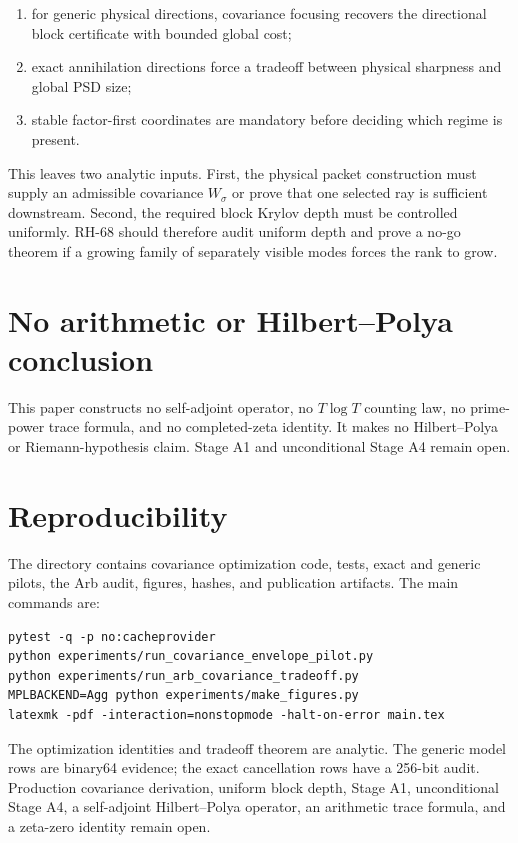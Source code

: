 \documentclass[11pt]{article}
\begin{document}
\begin{enumerate}[leftmargin=2.2em]
 \item for generic physical directions, covariance focusing recovers the
       directional block certificate with bounded global cost;
 \item exact annihilation directions force a tradeoff between physical
       sharpness and global PSD size;
 \item stable factor-first coordinates are mandatory before deciding which
       regime is present.
\end{enumerate}

This leaves two analytic inputs.  First, the physical packet construction
must supply an admissible covariance $W_\sigma$ or prove that one selected ray
is sufficient downstream.  Second, the required block Krylov depth must be
controlled uniformly.  RH-68 should therefore audit uniform depth and prove
a no-go theorem if a growing family of separately visible modes forces the
rank to grow.

\section{No arithmetic or Hilbert--Polya conclusion}

This paper constructs no self-adjoint operator, no $T\log T$ counting law,
no prime-power trace formula, and no completed-zeta identity.  It makes no
Hilbert--Polya or Riemann-hypothesis claim.  Stage A1 and unconditional Stage
A4 remain open.

\section{Reproducibility}

The directory contains covariance optimization code, tests, exact and
generic pilots, the Arb audit, figures, hashes, and publication artifacts.
The main commands are:
\begin{verbatim}
pytest -q -p no:cacheprovider
python experiments/run_covariance_envelope_pilot.py
python experiments/run_arb_covariance_tradeoff.py
MPLBACKEND=Agg python experiments/make_figures.py
latexmk -pdf -interaction=nonstopmode -halt-on-error main.tex
\end{verbatim}

The optimization identities and tradeoff theorem are analytic.  The generic
model rows are binary64 evidence; the exact cancellation rows have a 256-bit
audit.  Production covariance derivation, uniform block depth, Stage A1,
unconditional Stage A4, a self-adjoint Hilbert--Polya operator, an arithmetic
trace formula, and a zeta-zero identity remain open.



\end{document}
